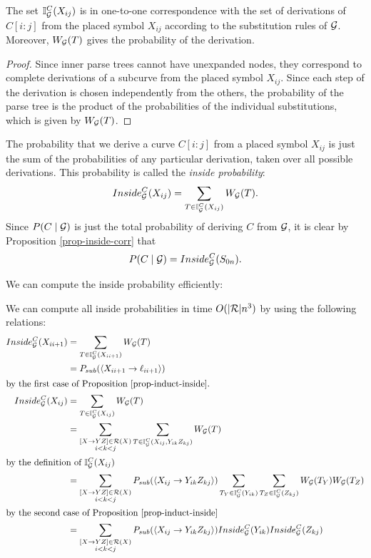 \begin{prop}
\label{prop-inside-corr}
  The set $\mathbb{I}_{{\mathcal G}}^C(X_{ij})$ is in one-to-one correspondence with
  the set of derivations of $C[i:j]$ from the placed symbol $X_{ij}$
  according to the substitution rules of ${\mathcal G}$. Moreover, $W_{{\mathcal G}}(T)$
  gives the probability of the derivation.
\end{prop}
\begin{proof}
Since inner parse trees cannot have unexpanded nodes, they correspond
to complete derivations of a subcurve from the placed symbol
$X_{ij}$. Since each step of the derivation is chosen independently
from the others, the probability of the parse tree is the product of
the probabilities of the individual substitutions, which is given by $W_{{\mathcal G}}(T)$.
\end{proof}

The probability that we derive a curve $C[i:j]$ from a placed symbol
$X_{ij}$ is just the sum of the probabilities of any particular
derivation, taken over all possible derivations. This probability is
called the \emph{inside probability}:
$$Inside_{{\mathcal G}}^C(X_{i j}) =  \sum_{T\in \mathbb{I}_{{\mathcal G}}^C(X_{ij})}W_{{\mathcal G}}(T).$$
Since $P(C\mid {\mathcal G})$ is just the total probability of deriving $C$
from ${\mathcal G}$, it is clear by Proposition \ref{prop-inside-corr} that 
$$P(C\mid {\mathcal G}) = Inside_{{\mathcal G}}^C(S_{0 n}).$$

We can compute the inside probability efficiently:

\begin{obs}
\label{obs-inside-rec}
We can compute all inside probabilities in time $O(|{\mathcal R}|n^3)$ by using the
following relations:
  \begin{align*}
Inside_{{\mathcal G}}^C(X_{i i+1}) &= \sum_{T\in \mathbb{I}_{{\mathcal G}}^C(X_{i i+1})}
W_{{\mathcal G}}(T)\\
 &= P_{sub}(\langle X_{i i+1} \to \ell_{i i+1} \rangle) \\
\intertext{by the first case of Proposition \ref{prop-induct-inside}.}
Inside_{{\mathcal G}}^C(X_{ij}) &= \sum_{T\in \mathbb{I}_{{\mathcal G}}^C(X_{ij})} W_{{\mathcal G}}(T)\\
&= \sum_{\substack{[X\to YZ] \in {\mathcal R}(X)\\ i < k < j}} \sum_{T\in
  \mathbb{I}_{{\mathcal G}}^C(X_{ij}, Y_{ik}Z_{kj})} W_{{\mathcal G}}(T)\\
\intertext{by the definition of $\mathbb{I}_{{\mathcal G}}^C(X_{ij})$}
&= \sum_{\substack{[X\to YZ] \in {\mathcal R}(X)\\ i < k < j}} 
P_{sub}(\langle X_{ij} \to Y_{ik} Z_{kj} \rangle)
\sum_{T_Y\in \mathbb{I}_{{\mathcal G}}^C(Y_{ik})}
\sum_{T_Z\in \mathbb{I}_{{\mathcal G}}^C(Z_{kj})}
 W_{{\mathcal G}}(T_Y) W_{{\mathcal G}}(T_Z)\\
\intertext{by the second case of Proposition \ref{prop-induct-inside}}
&= \sum_{\substack{[X\to YZ] \in {\mathcal R}(X)\\ i < k < j}} 
P_{sub}(\langle  X_{ij} \to Y_{ik} Z_{kj} \rangle)
Inside_{{\mathcal G}}^C(Y_{ik})
Inside_{{\mathcal G}}^C(Z_{kj})
  \end{align*}
\end{obs}

